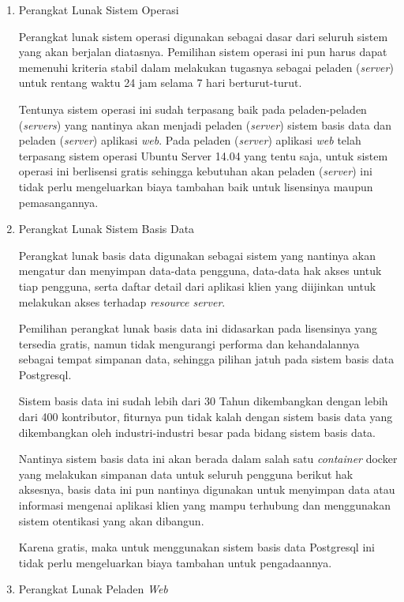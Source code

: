 \documentclass[pdftex,12pt, oneside]{article}
\begin{document}
\begin{enumerate}
	\item Perangkat Lunak Sistem Operasi

Perangkat lunak sistem operasi digunakan sebagai dasar dari seluruh sistem yang akan berjalan diatasnya. Pemilihan sistem operasi ini pun harus dapat memenuhi kriteria stabil dalam melakukan tugasnya sebagai peladen (\textit{server}) untuk rentang waktu 24 jam selama 7 hari berturut-turut.

Tentunya sistem operasi ini sudah terpasang baik pada peladen-peladen (\textit{servers}) yang nantinya akan menjadi peladen (\textit{server}) sistem basis data dan peladen (\textit{server}) aplikasi \textit{web}. Pada peladen (\textit{server}) aplikasi \textit{web} telah terpasang sistem operasi Ubuntu Server 14.04 yang tentu saja, untuk sistem operasi ini berlisensi gratis sehingga kebutuhan akan peladen (\textit{server}) ini tidak perlu mengeluarkan biaya tambahan baik untuk lisensinya maupun pemasangannya.

\item Perangkat Lunak Sistem Basis Data
	
Perangkat lunak basis data digunakan sebagai sistem yang nantinya akan mengatur dan menyimpan data-data pengguna, data-data hak akses untuk tiap pengguna, serta daftar detail dari aplikasi klien yang diijinkan untuk melakukan akses terhadap \textit{resource server}. 

Pemilihan perangkat lunak basis data ini didasarkan pada lisensinya yang tersedia gratis, namun tidak mengurangi performa dan kehandalannya sebagai tempat simpanan data, sehingga pilihan jatuh pada sistem basis data Postgresql.

Sistem basis data ini sudah lebih dari 30 Tahun dikembangkan dengan lebih dari 400 kontributor, fiturnya pun tidak kalah dengan sistem basis data yang dikembangkan oleh industri-industri besar pada bidang sistem basis data.

Nantinya sistem basis data ini akan berada dalam salah satu \textit{container} docker yang melakukan simpanan data untuk seluruh pengguna berikut hak aksesnya, basis data ini pun nantinya digunakan untuk menyimpan data atau informasi mengenai aplikasi klien yang mampu terhubung dan menggunakan sistem otentikasi yang akan dibangun.

Karena gratis, maka untuk menggunakan sistem basis data Postgresql ini tidak perlu mengeluarkan biaya tambahan untuk pengadaannya.

	\item Perangkat Lunak Peladen \textit{Web}
	

\end{enumerate}
\end{document}
